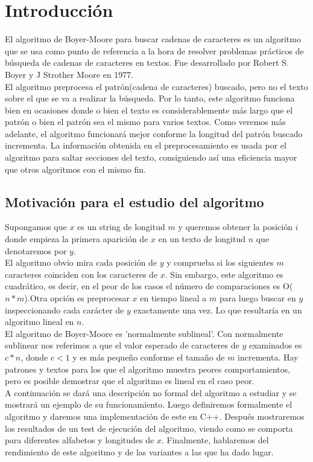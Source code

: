 \section{Introducción}
\label{sec:introduction}
El algoritmo de Boyer-Moore para buscar cadenas de caracteres es un algoritmo que se usa como punto de referencia a la hora de resolver problemas prácticos de búsqueda de cadenas de caracteres en textos. Fue desarrollado por Robert S. Boyer y J Strother Moore en 1977. \\

El algoritmo preprocesa el patrón(cadena de caracteres) buscado, pero no el texto sobre el que se va a realizar la búsqueda. Por lo tanto, este algoritmo funciona bien en ocasiones donde o bien el texto es considerablemente más largo que el patrón o bien el patrón sea el mismo para varios textos. Como veremos más adelante, el algoritmo funcionará mejor conforme la longitud del patrón buscado incrementa. La información obtenida en el preprocesamiento es usada por el algoritmo para saltar secciones del texto, consiguiendo así una eficiencia mayor que otros algoritmos con el mismo fin. \\


\subsection{Motivación para el estudio del algoritmo}
Supongamos que $x$ es un string de longitud $m$ y queremos obtener la posición $i$ donde empieza la primera aparición de $x$ en un texto  de longitud $n$ que denotaremos por $y$.\\

El algoritmo obvio mira cada posición de $y$ y comprueba si los siguientes $m$ caracteres coinciden con los caracteres de $x$. Sin embargo, este algoritmo es cuadrático, es decir, en el peor de los casos el número de comparaciones es O($n*m$).Otra opción es preprocesar $x$ en tiempo lineal a $m$ para luego buscar en $y$ inspeccionando cada carácter de $y$ exactamente una vez. Lo que resultaría en un algoritmo lineal en $n$.\\

El algoritmo de Boyer-Moore es 'normalmente sublineal'. Con normalmente sublinear nos referimos a que el valor esperado de caracteres de $y$ examinados es $c*n$, donde $c < 1$ y es más pequeño conforme el tamaño de $m$ incrementa. Hay patrones y textos para los que el algoritmo muestra peores comportamientos, pero es posible demostrar que el algoritmo es lineal en el caso peor.\\

A continuación se dará una descripción no formal del algoritmo a estudiar y se mostrará un ejemplo de su funcionamiento. Luego definiremos formalmente el algoritmo y daremos una implementación de este en C++. Después mostraremos los resultados de un test de ejecución del algoritmo, viendo como se comporta para diferentes alfabetos y longitudes de $x$. Finalmente, hablaremos del rendimiento de este algoritmo y de las variantes a las que ha dado lugar.